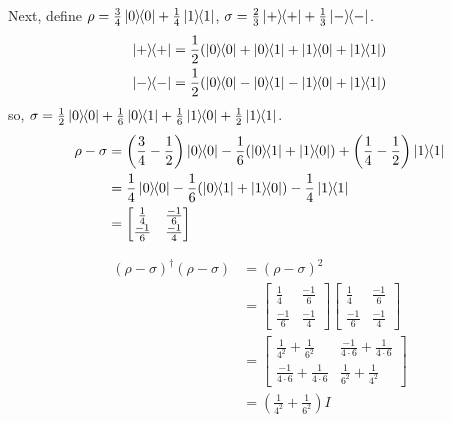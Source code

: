 Next, define $\rho = \frac{3}{4}\ket{0}\hspace{-1mm} \bra{0} + \frac{1}{4}\ket{1}\hspace{-1mm} \bra{1}$, $\sigma = \frac{2}{3} \ket{+}\hspace{-1mm} \bra{+} + \frac{1}{3}\ket{-}\hspace{-1mm} \bra{-}$.
\begin{align*}
	\kb{+} &= \frac{1}{2} (\kb{0} + \kbt{0}{1} + \kbt{1}{0} + \kb{1})\\
	\kb{-} &= \frac{1}{2} (\kb{0} - \kbt{0}{1} - \kbt{1}{0} + \kb{1})
\end{align*}
so, $\sigma = \frac{1}{2}\ket{0}\hspace{-1mm} \bra{0}+\frac{1}{6}\ket{0}\hspace{-1mm} \bra{1}+\frac{1}{6}\ket{1}\hspace{-1mm} \bra{0}+\frac{1}{2}\ket{1}\hspace{-1mm} \bra{1}$.
\begin{align*}
	\rho - \sigma &= \left(\frac{3}{4} - \frac{1}{2}\right) \kb{0} - \frac{1}{6} (\kbt{0}{1} + \kbt{1}{0}) + \left(\frac{1}{4} - \frac{1}{2}\right) \kb{1}\\
		&= \frac{1}{4} \kb{0} - \frac{1}{6} (\kbt{0}{1} + \kbt{1}{0}) - \frac{1}{4} \kb{1}\\
			&= \begin{bmatrix}\frac{1}{4} & \frac{-1}{6} \\ \frac{-1}{6} & \frac{-1}{4}\end{bmatrix}
\end{align*}

\begin{align*}
	(\rho - \sigma)^\dagger (\rho - \sigma) &= (\rho-\sigma)^2 \tag{$\rho-\sigma$ is symmetric, real-valued} \\
	& = \begin{bmatrix}\frac{1}{4} & \frac{-1}{6} \\ \frac{-1}{6} & \frac{-1}{4}\end{bmatrix}\begin{bmatrix}\frac{1}{4} & \frac{-1}{6} \\ \frac{-1}{6} & \frac{-1}{4}\end{bmatrix} \\
	&= \begin{bmatrix}\frac{1}{4^2}+\frac{1}{6^2} & \frac{-1}{4\cdot6}+\frac{1}{4\cdot6} \\ \frac{-1}{4\cdot6}+\frac{1}{4\cdot6} & \frac{1}{6^2}+\frac{1}{4^2} \end{bmatrix} \\
	&= \left(\frac{1}{4^2}+\frac{1}{6^2}\right)I	
\end{align*}


